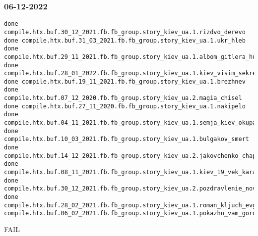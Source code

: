  
 
 
 
 

\subsubsection{06-12-2022}
\label{sec:build.log.06_12_2022}

\begin{Verbatim}
done compile.htx.buf.30_12_2021.fb.fb_group.story_kiev_ua.1.rizdvo_derevo
done compile.htx.buf.31_03_2021.fb.fb_group.story_kiev_ua.1.ukr_hleb
done compile.htx.buf.29_11_2021.fb.fb_group.story_kiev_ua.1.albom_gitlera_hudozhnik_gluschenko
done compile.htx.buf.28_01_2022.fb.fb_group.story_kiev_ua.1.kiev_visim_sekretiv
done compile.htx.buf.19_11_2021.fb.fb_group.story_kiev_ua.1.brezhnev
done compile.htx.buf.07_12_2020.fb.fb_group.story_kiev_ua.2.magia_chisel
done compile.htx.buf.27_11_2020.fb.fb_group.story_kiev_ua.1.nakipelo
done compile.htx.buf.04_11_2021.fb.fb_group.story_kiev_ua.1.semja_kiev_okupacia
done compile.htx.buf.10_03_2021.fb.fb_group.story_kiev_ua.1.bulgakov_smert
done compile.htx.buf.14_12_2021.fb.fb_group.story_kiev_ua.2.jakovchenko_chaplin
done compile.htx.buf.08_11_2021.fb.fb_group.story_kiev_ua.1.kiev_19_vek_karaim_kupec_kogen
done compile.htx.buf.30_12_2021.fb.fb_group.story_kiev_ua.2.pozdravlenie_novyj_god_rizdvo
done compile.htx.buf.28_02_2021.fb.fb_group.story_kiev_ua.1.roman_kljuch_evgenij_iljin
compile.htx.buf.06_02_2021.fb.fb_group.story_kiev_ua.1.pokazhu_vam_gorod
\end{Verbatim}

FAIL

